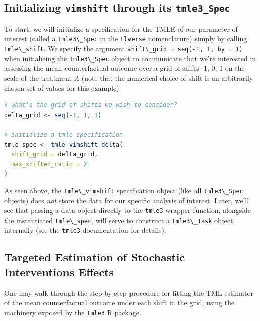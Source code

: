 \documentclass[12pt, krantz2,]{krantz}
\newcommand{\passthrough}[1]{#1}
\theoremstyle{definition}
\theoremstyle{definition}
\theoremstyle{definition}
\newcommand{\1}{\mathbbm{1}}
\begin{document}
\hypertarget{initializing-vimshift-through-its-tmle3_spec}{%
\subsection{\texorpdfstring{Initializing \texttt{vimshift} through its \texttt{tmle3\_Spec}}{Initializing vimshift through its tmle3\_Spec}}\label{initializing-vimshift-through-its-tmle3_spec}}

To start, we will initialize a specification for the TMLE of our parameter of
interest (called a \passthrough{\lstinline!tmle3\_Spec!} in the \passthrough{\lstinline!tlverse!} nomenclature) simply by calling
\passthrough{\lstinline!tmle\_shift!}. We specify the argument \passthrough{\lstinline!shift\_grid = seq(-1, 1, by = 1)!}
when initializing the \passthrough{\lstinline!tmle3\_Spec!} object to communicate that we're interested
in assessing the mean counterfactual outcome over a grid of shifts -1, 0, 1 on the scale of the treatment \(A\) (note that the numerical
choice of shift is an arbitrarily chosen set of values for this example).

\begin{lstlisting}[language=R]
# what's the grid of shifts we wish to consider?
delta_grid <- seq(-1, 1, 1)

# initialize a tmle specification
tmle_spec <- tmle_vimshift_delta(
  shift_grid = delta_grid,
  max_shifted_ratio = 2
)
\end{lstlisting}

As seen above, the \passthrough{\lstinline!tmle\_vimshift!} specification object (like all \passthrough{\lstinline!tmle3\_Spec!}
objects) does \emph{not} store the data for our specific analysis of interest. Later,
we'll see that passing a data object directly to the \passthrough{\lstinline!tmle3!} wrapper function,
alongside the instantiated \passthrough{\lstinline!tmle\_spec!}, will serve to construct a \passthrough{\lstinline!tmle3\_Task!}
object internally (see the \passthrough{\lstinline!tmle3!} documentation for details).

\hypertarget{targeted-estimation-of-stochastic-interventions-effects-1}{%
\subsection{Targeted Estimation of Stochastic Interventions Effects}\label{targeted-estimation-of-stochastic-interventions-effects-1}}

One may walk through the step-by-step procedure for fitting the TML estimator
of the mean counterfactual outcome under each shift in the grid, using the
machinery exposed by the \href{https://tmle3.tlverse.org/}{\passthrough{\lstinline!tmle3!} R package}.
\end{document}
